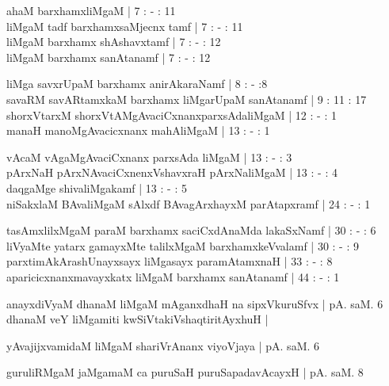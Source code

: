 \begin{entry}
\gl{}
\begin{shl}
ahaM barxhamxliMgaM | 7 : - : 11\\
liMgaM tadf barxhamxsaMjecnx tamf | 7 : - : 11\\
liMgaM barxhamx shAshavxtamf | 7 : - : 12\\
liMgaM barxhamx sanAtanamf | 7 : - : 12
\end{shl}
\gl{}
\begin{shl}
liMga savxrUpaM barxhamx anirAkaraNamf | 8 : - :8\\
savaRM savARtamxkaM barxhamx liMgarUpaM sanAtanamf | 9 : 11 : 17\\
shorxVtarxM shorxVtAMgAvaciCxnanxparxsAdaliMgaM | 12 : - : 1\\
manaH manoMgAvacicxnanx mahAliMgaM | 13 : - : 1
\end{shl}
\gl{}
\begin{shl}
vAcaM vAgaMgAvaciCxnanx parxsAda liMgaM | 13 : - : 3\\
pArxNaH pArxNAvaciCxnenxVshavxraH pArxNaliMgaM | 13 : - : 4\\
daqgaMge shivaliMgakamf | 13 : - : 5\\
niSakxlaM BAvaliMgaM sAlxdf BAvagArxhayxM parAtapxramf | 24 : - : 1
\end{shl}
\gl{}
\begin{shl}
tasAmxlilxMgaM paraM barxhamx saciCxdAnaMda lakaSxNamf | 30 : - : 6\\
liVyaMte yatarx gamayxMte talilxMgaM barxhamxkeVvalamf | 30 : - : 9\\
parxtimAkArashUnayxsayx liMgasayx paramAtamxnaH | 33 : - : 8\\
aparicicxnanxmavayxkatx liMgaM barxhamx sanAtanamf | 44 : - : 1
\end{shl}
\gl{}
\begin{shl}
anayxdiVyaM dhanaM liMgaM mAganxdhaH na sipxVkuruSfvx | pA. saM. 6\\
dhanaM veY liMgamiti kwSiVtakiVshaqtiritAyxhuH |
\end{shl}
\gl{}
\begin{shl}
yAvajijxvamidaM liMgaM shariVrAnanx viyoVjaya | pA. saM. 6
\end{shl}
\gl{}
\begin{shl}
guruliRMgaM jaMgamaM ca puruSaH puruSapadavAcayxH | pA. saM. 8

\end{shl}
\end{entry}
